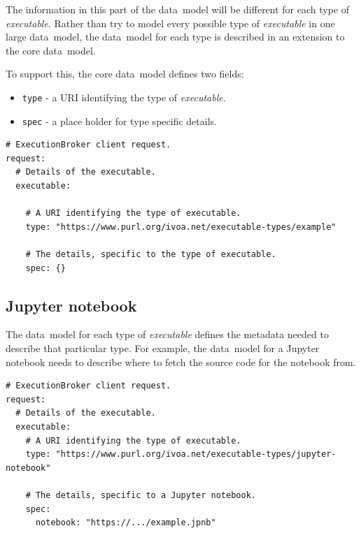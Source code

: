 \documentclass[11pt,a4paper]{ivoa}
\newcommand{\datamodel} {data~model}
\newcommand{\jupyternotebook} {Jupyter notebook}
\newcommand{\codeword}[1] {\texttt{#1}}
\newcommand{\executable} {\textit{executable}}
\begin{document}
The information in this part of the \datamodel{} will be different for each type of \executable{}.
Rather than try to model every possible type of \executable{} in one large \datamodel{},
the \datamodel{} for each type is described in an extension to the core \datamodel{}.

To support this, the core \datamodel{} defines two fields:
\begin{itemize}
  \item \codeword{type} - a URI identifying the type of \executable{}.
  \item \codeword{spec} - a place holder for type specific details.
\end{itemize}

\begin{lstlisting}[]
# ExecutionBroker client request.
request:
  # Details of the executable.
  executable:

    # A URI identifying the type of executable.
    type: "https://www.purl.org/ivoa.net/executable-types/example"

    # The details, specific to the type of executable.
    spec: {}
\end{lstlisting}

\subsection{\jupyternotebook{}}
\label{jupyternotebook}
The \datamodel{} for each type of \executable{} defines the metadata needed to
describe that particular type.
For example, the \datamodel{} for a \jupyternotebook{} needs to describe where
to fetch the source code for the notebook from.

\begin{lstlisting}[]
# ExecutionBroker client request.
request:
  # Details of the executable.
  executable:
    # A URI identifying the type of executable.
    type: "https://www.purl.org/ivoa.net/executable-types/jupyter-notebook"

    # The details, specific to a Jupyter notebook.
    spec:
      notebook: "https://.../example.jpnb"
\end{lstlisting}
\end{document}
